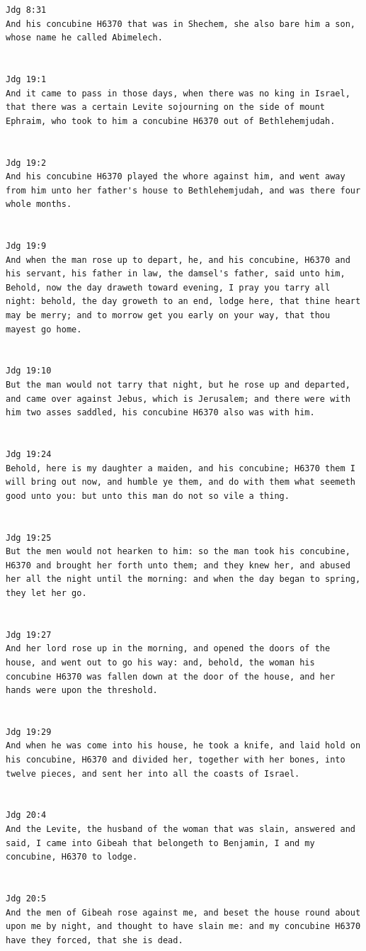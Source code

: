 \documentclass[11pt]{article}
\begin{document}
{\begin{lstlisting}
Jdg 8:31
And his concubine H6370 that was in Shechem, she also bare him a son, whose name he called Abimelech.


Jdg 19:1
And it came to pass in those days, when there was no king in Israel, that there was a certain Levite sojourning on the side of mount Ephraim, who took to him a concubine H6370 out of Bethlehemjudah.


Jdg 19:2
And his concubine H6370 played the whore against him, and went away from him unto her father's house to Bethlehemjudah, and was there four whole months.


Jdg 19:9
And when the man rose up to depart, he, and his concubine, H6370 and his servant, his father in law, the damsel's father, said unto him, Behold, now the day draweth toward evening, I pray you tarry all night: behold, the day groweth to an end, lodge here, that thine heart may be merry; and to morrow get you early on your way, that thou mayest go home.


Jdg 19:10
But the man would not tarry that night, but he rose up and departed, and came over against Jebus, which is Jerusalem; and there were with him two asses saddled, his concubine H6370 also was with him.


Jdg 19:24
Behold, here is my daughter a maiden, and his concubine; H6370 them I will bring out now, and humble ye them, and do with them what seemeth good unto you: but unto this man do not so vile a thing.


Jdg 19:25
But the men would not hearken to him: so the man took his concubine, H6370 and brought her forth unto them; and they knew her, and abused her all the night until the morning: and when the day began to spring, they let her go.


Jdg 19:27
And her lord rose up in the morning, and opened the doors of the house, and went out to go his way: and, behold, the woman his concubine H6370 was fallen down at the door of the house, and her hands were upon the threshold.


Jdg 19:29
And when he was come into his house, he took a knife, and laid hold on his concubine, H6370 and divided her, together with her bones, into twelve pieces, and sent her into all the coasts of Israel.


Jdg 20:4
And the Levite, the husband of the woman that was slain, answered and said, I came into Gibeah that belongeth to Benjamin, I and my concubine, H6370 to lodge.


Jdg 20:5
And the men of Gibeah rose against me, and beset the house round about upon me by night, and thought to have slain me: and my concubine H6370 have they forced, that she is dead.



\end{lstlisting}}
\end{document}
